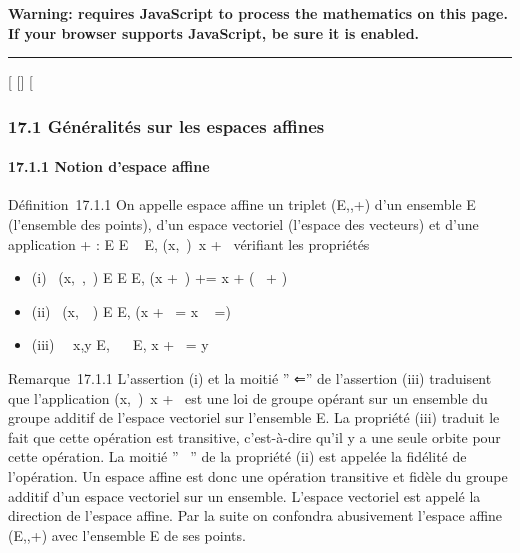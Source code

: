 \textbf{Warning: 
requires JavaScript to process the mathematics on this page.\\ If your
browser supports JavaScript, be sure it is enabled.}

\begin{center}\rule{3in}{0.4pt}\end{center}

{[}
{[}{]}
{[}

\subsubsection{17.1 Généralités sur les espaces affines}

\paragraph{17.1.1 Notion d'espace affine}

Définition~17.1.1 On appelle espace affine un triplet
(E,\overrightarrowE,+) d'un ensemble E (l'ensemble
des points), d'un espace vectoriel \overrightarrowE
(l'espace des vecteurs) et d'une application + : E
\times\overrightarrow E \rightarrow~ E,
(x,\overrightarrow\xi~)\mapsto~x
+\overrightarrow \xi~ vérifiant les propriétés

\begin{itemize}
\itemsep1pt\parskip0pt
\item
  (i)
  \forall~(x,\overrightarrow\xi~,\overrightarrow\eta~)
  \in E \times\overrightarrow E
  \times\overrightarrow E, (x
  +\overrightarrow \xi~)
  +\overrightarrow \eta = x +
  (\overrightarrow\xi~ +\overrightarrow
  \eta)
\item
  (ii)
  \forall~(x,\overrightarrow\xi~~) \in E
  \times\overrightarrow E, \left (x
  +\overrightarrow \xi~ = x \Leftrightarrow
  \overrightarrow\xi~ =\right )
\item
  (iii) \forall~~x,y \in E,
  \exists\overrightarrow\xi~~
  \in\overrightarrow E, x
  +\overrightarrow \xi~ = y
\end{itemize}

Remarque~17.1.1 L'assertion (i) et la moitié '' ⇐'' de l'assertion (iii)
traduisent que l'application
(x,\overrightarrow\xi~)\mapsto~x
+\overrightarrow \xi~ est une loi de groupe opérant sur
un ensemble du groupe additif de l'espace vectoriel
\overrightarrowE sur l'ensemble E. La propriété (iii)
traduit le fait que cette opération est transitive, c'est-à-dire qu'il y
a une seule orbite pour cette opération. La moitié '' \rigtharrow~'' de la
propriété (ii) est appelée la fidélité de l'opération. Un espace affine
est donc une opération transitive et fidèle du groupe additif d'un
espace vectoriel sur un ensemble. L'espace vectoriel
\overrightarrowE est appelé la direction de l'espace
affine. Par la suite on confondra abusivement l'espace affine
(E,\overrightarrowE,+) avec l'ensemble E de ses
points.

